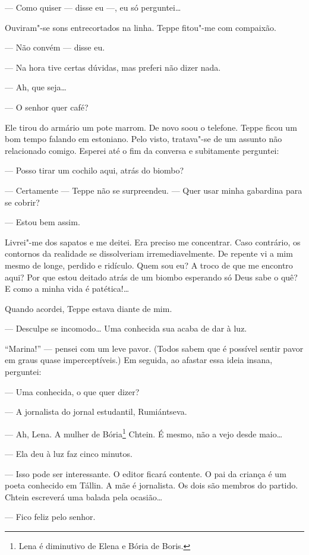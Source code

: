 --- Como quiser --- disse eu ---, eu só perguntei\ldots{}

Ouviram"-se sons entrecortados na linha. Teppe fitou"-me com compaixão.

--- Não convém --- disse eu.

--- Na hora tive certas dúvidas, mas preferi não dizer nada.

--- Ah, que seja\ldots{}

--- O senhor quer café?

Ele tirou do armário um pote marrom. De novo soou o telefone. Teppe
ficou um bom tempo falando em estoniano. Pelo visto, tratava"-se de um
assunto não relacionado comigo. Esperei até o fim da conversa e
subitamente perguntei:

--- Posso tirar um cochilo aqui, atrás do biombo?

--- Certamente --- Teppe não se surpreendeu. --- Quer usar minha
gabardina para se cobrir?

--- Estou bem assim.

Livrei"-me dos sapatos e me deitei. Era preciso me concentrar. Caso
contrário, os contornos da realidade se dissolveriam irremediavelmente.
De repente vi a mim mesmo de longe, perdido e ridículo. Quem sou eu? A
troco de que me encontro aqui? Por que estou deitado atrás de um biombo
esperando só Deus sabe o quê? E como a minha vida é patética!\ldots{}

Quando acordei, Teppe estava diante de mim.

--- Desculpe se incomodo\ldots{} Uma conhecida sua acaba de dar à luz.

``Marina!'' --- pensei com um leve pavor. (Todos sabem que é possível
sentir pavor em graus quase imperceptíveis.) Em seguida, ao afastar essa
ideia insana, perguntei:

--- Uma conhecida, o que quer dizer?

--- A jornalista do jornal estudantil, Rumiántseva.

--- Ah, Lena. A mulher de Bória\footnote{Lena é diminutivo de Elena e
  Bória de Boris.} Chtein. É mesmo, não a vejo desde maio\ldots{}

--- Ela deu à luz faz cinco minutos.

--- Isso pode ser interessante. O editor ficará contente. O pai da
criança é um poeta conhecido em Tállin. A mãe é jornalista. Os dois são
membros do partido. Chtein escreverá uma balada pela ocasião\ldots{}

--- Fico feliz pelo senhor.

